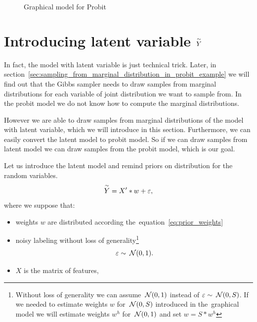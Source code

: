 \begin{figure}[!hb]
\centering

\caption{Graphical model for Probit}
\label{fig:probitGM}
\end{figure}

\section{Introducing latent variable $\overset{\sim}{Y}$ }
\label{sec:introducing_latent_variale}
In fact, the model with latent variable is just technical trick. Later, in section~\ref{sec:sampling_from_marginal_distribution_in_probit_example} we will find out that the Gibbs sampler needs to draw samples from marginal distributions for each variable of joint distribution we want to sample from. In the probit model we do not know how to compute the marginal distributions.

However we are able to draw samples from marginal distributions of the model with latent variable, which we will introduce in this section. Furthermore, we can easily convert the latent model to probit model. So if we can draw samples from latent model we can draw samples from the probit model, which is our goal.

Let us introduce the latent model and remind priors on distribution for the random variables.
\begin{equation}\label{eq:lat}
    \overset{\sim}{Y} = X' * w + \varepsilon, 
\end{equation}
where we suppose that:
\begin{itemize}
    \item weights $w$ are distributed according the~equation~\ref{eq:prior_weights} 
    \item noisy labeling without loss of generality\footnote{Without loss of generality we can assume $\:\mathcal{N}(0,1)$ instead of $\varepsilon \sim \:\mathcal{N}(0, S)$. 
        If we needed to estimate weights $w$ for $\:\mathcal{N}(0, S)$ introduced in the~graphical model we will estimate weights $w^h$ for $\:\mathcal{N}(0,1)$ and set $w = S*w^h$}
        \begin{equation}\label{eq:noise}
        \varepsilon \sim \:\mathcal{N}(0, 1).
        \end{equation}
    \item $X$ is the matrix of features, \\
\end{itemize}

